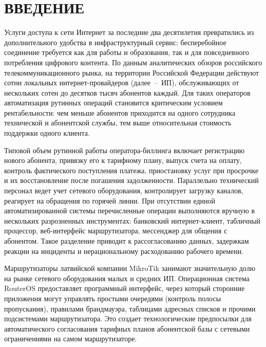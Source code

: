 \section*{ВВЕДЕНИЕ}


Услуги доступа к сети Интернет за последние два десятилетия превратились из дополнительного удобства в инфраструктурный сервис: бесперебойное соединение требуется как для работы и образования, так и для повседневного потребления цифрового контента. По данным аналитических обзоров российского телекоммуникационного рынка, на территории Российской Федерации действуют сотни локальных интернет-провайдеров (далее~--~ИП), обслуживающих от нескольких сотен до десятков тысяч абонентов каждый. Для таких операторов автоматизация рутинных операций становится критическим условием рентабельности: чем меньше абонентов приходится на одного сотрудника технической и абонентской службы, тем выше относительная стоимость поддержки одного клиента.

Типовой объем рутинной работы оператора-биллинга включает регистрацию нового абонента, привязку его к тарифному плану, выпуск счета на оплату, контроль фактического поступления платежа, приостановку услуг при просрочке и их восстановление после погашения задолженности. Параллельно технический персонал ведет учет сетевого оборудования, контролирует загрузку каналов, реагирует на обращения по горячей линии. При отсутствии единой автоматизированной системы перечисленные операции выполняются вручную в нескольких разрозненных инструментах: банковский интернет-клиент, табличный процессор, веб-интерфейс маршрутизатора, мессенджер для общения с абонентом. Такое разделение приводит к рассогласованию данных, задержкам реакции на инциденты и нерациональному расходованию рабочего времени.

Маршрутизаторы латвийской компании MikroTik занимают значительную долю на рынке сетевого оборудования малых и средних ИП. Операционная система RouterOS предоставляет программный интерфейс, через который сторонние приложения могут управлять простыми очередями (контроль полосы пропускания), правилами брандмауэра, таблицами адресных списков и прочими подсистемами маршрутизатора. Это создает технологические предпосылки для автоматического согласования тарифных планов абонентской базы с сетевыми ограничениями на самом маршрутизаторе.

